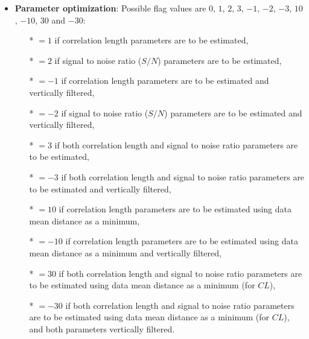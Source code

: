 \begin{itemize}
\item {\bf Parameter optimization}: Possible flag values are $0$, $1$, $2$, $3$, $-1$, $-2$, $-3$, $10$, $-10$, $30$ and $-30$:
              \begin{itemize}
                \item[*] $=1$ if correlation length parameters are to be estimated,
                \item[*] $=2$ if signal to noise ratio ($S/N$) parameters are to be estimated,
                \item[*] $=-1$ if correlation length parameters are to be estimated and vertically filtered,
                \item[*] $=-2$ if signal to noise ratio ($S/N$) parameters are to be estimated and vertically filtered,
                \item[*] $=3$ if both  correlation length and  signal to noise ratio parameters are to be estimated,
                \item[*] $=-3$ if both  correlation length and  signal to noise ratio parameters are to be estimated and vertically filtered,

                \item[*] $=10$ if correlation length parameters are to be estimated using data mean distance as a minimum,
                \item[*] $=-10$ if correlation length parameters are to be estimated using data mean distance as a minimum and vertically filtered,
                \item[*] $=30$ if both  correlation length and  signal to noise ratio parameters are to be estimated using data mean distance as a minimum (for $CL$),
                \item[*] $=-30$ if both  correlation length and  signal to noise ratio parameters are to be estimated using data mean distance as a minimum (for $CL$), and both parameters vertically filtered.
              \end{itemize}


\end{itemize}
